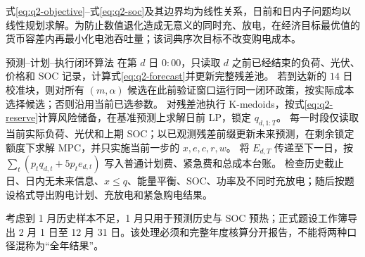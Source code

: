 式\eqref{eq:q2-objective}--式\eqref{eq:q2-soc}及其边界均为线性关系，日前和日内子问题均以线性规划求解。为防止数值退化造成无意义的同时充、放电，在经济目标最优值的货币容差内再最小化电池吞吐量；该词典序次目标不改变购电成本。

\noindent 预测--计划--执行闭环算法
\algorithmstart
{}
在第 $d$ 日 $0{:}00$，只读取 $d$ 之前已经结束的负荷、光伏、价格和 SOC 记录，计算式\eqref{eq:q2-forecast}并更新完整残差池。
若到达新的 $14$ 日校准块，则对所有 $(m,\alpha)$ 候选在此前验证窗口运行同一闭环政策，按实际成本选择候选；否则沿用当前已选参数。
对残差池执行 K-medoids，按式\eqref{eq:q2-reserve}计算风险储备，在基准预测上求解日前 LP，锁定 $q_{d,1:T}$。
每一时段仅读取当前实际负荷、光伏和上期 SOC；以已观测残差前缀更新未来预测，在剩余锁定额度下求解 MPC\cite{parisio}，并只实施当前一步的 $x,e,c,r,w$。
将 $E_{d,T}$ 传递至下一日，按 $\sum_t(p_tq_{d,t}+5p_te_{d,t})$ 写入普通计划费、紧急费和总成本台账。
检查历史截止日、日内无未来信息、$x\le q$、能量平衡、SOC、功率及不同时充放电；随后按题设格式导出购电计划、充放电和紧急购电结果。
\algorithmend

考虑到 1 月历史样本不足，1 月只用于预测历史与 SOC 预热；正式题设工作簿导出 2 月 1 日至 12 月 31 日。该处理必须和完整年度核算分开报告，不能将两种口径混称为“全年结果”。
